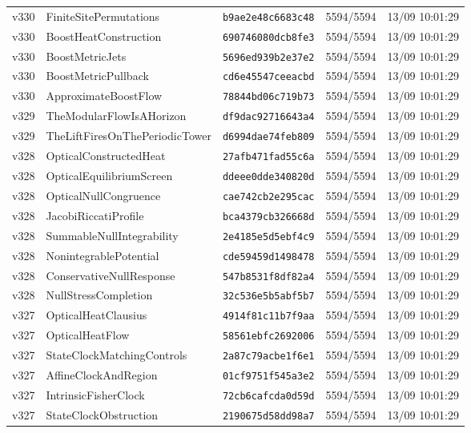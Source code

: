 \documentclass[11pt]{article}
\theoremstyle{definition}\newtheorem{deriv}{Derivation}
\begin{document}
{\begin{longtable}{@{}lllll@{}}
v330 & FiniteSitePermutations & \texttt{b9ae2e48c6683c48} & 5594/5594 & 13/09 10:01:29 \\
v330 & BoostHeatConstruction & \texttt{690746080dcb8fe3} & 5594/5594 & 13/09 10:01:29 \\
v330 & BoostMetricJets & \texttt{5696ed939b2e37e2} & 5594/5594 & 13/09 10:01:29 \\
v330 & BoostMetricPullback & \texttt{cd6e45547ceeacbd} & 5594/5594 & 13/09 10:01:29 \\
v330 & ApproximateBoostFlow & \texttt{78844bd06c719b73} & 5594/5594 & 13/09 10:01:29 \\
v329 & TheModularFlowIsAHorizon & \texttt{df9dac92716643a4} & 5594/5594 & 13/09 10:01:29 \\
v329 & TheLiftFiresOnThePeriodicTower & \texttt{d6994dae74feb809} & 5594/5594 & 13/09 10:01:29 \\
v328 & OpticalConstructedHeat & \texttt{27afb471fad55c6a} & 5594/5594 & 13/09 10:01:29 \\
v328 & OpticalEquilibriumScreen & \texttt{ddeee0dde340820d} & 5594/5594 & 13/09 10:01:29 \\
v328 & OpticalNullCongruence & \texttt{cae742cb2e295cac} & 5594/5594 & 13/09 10:01:29 \\
v328 & JacobiRiccatiProfile & \texttt{bca4379cb326668d} & 5594/5594 & 13/09 10:01:29 \\
v328 & SummableNullIntegrability & \texttt{2e4185e5d5ebf4c9} & 5594/5594 & 13/09 10:01:29 \\
v328 & NonintegrablePotential & \texttt{cde59459d1498478} & 5594/5594 & 13/09 10:01:29 \\
v328 & ConservativeNullResponse & \texttt{547b8531f8df82a4} & 5594/5594 & 13/09 10:01:29 \\
v328 & NullStressCompletion & \texttt{32c536e5b5abf5b7} & 5594/5594 & 13/09 10:01:29 \\
v327 & OpticalHeatClausius & \texttt{4914f81c11b7f9aa} & 5594/5594 & 13/09 10:01:29 \\
v327 & OpticalHeatFlow & \texttt{58561ebfc2692006} & 5594/5594 & 13/09 10:01:29 \\
v327 & StateClockMatchingControls & \texttt{2a87c79acbe1f6e1} & 5594/5594 & 13/09 10:01:29 \\
v327 & AffineClockAndRegion & \texttt{01cf9751f545a3e2} & 5594/5594 & 13/09 10:01:29 \\
v327 & IntrinsicFisherClock & \texttt{72cb6cafcda0d59d} & 5594/5594 & 13/09 10:01:29 \\
v327 & StateClockObstruction & \texttt{2190675d58dd98a7} & 5594/5594 & 13/09 10:01:29 \\

\end{longtable}}
\end{document}
